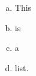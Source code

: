 \documentclass[10pt, letterpaper]{article}
\begin{document}
\begin{enumerate}[a.]
\item This
\item is
\item a
\item list.
\end{enumerate}




\fontsize{10pt}{10pt}\selectfont
{} %

\end{document}

